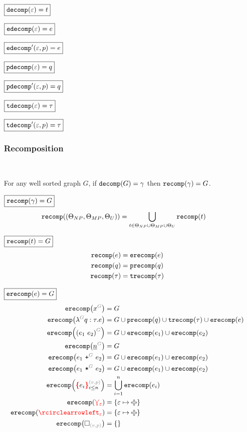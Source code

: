 \noindent $\boxed{\decomp{\e} = t}$
%
\figureDecompositionDefDecompTerm

\noindent $\boxed{\edecomp{\e} = e}$
%
\figureDecompositionDefEdecomp

\noindent $\boxed{\edecompPrime{\e}{p} = e}$
%
\figureDecompositionDefEdecompPrime

\noindent $\boxed{\pdecomp{\e} = q}$
%
\figureDecompositionDefPdecomp

\noindent $\boxed{\pdecompPrime{\e}{p} = q}$
%
\figureDecompositionDefPdecompPrime

\noindent $\boxed{\tdecomp{\e} = \tau}$
%
\figureDecompositionDefTdecomp

\noindent $\boxed{\tdecompPrime{\e}{p} = \tau}$
%
\figureDecompositionDefTdecompPrime%


\subsubsection{Recomposition}\hspace*{\fill} \\

\begin{theorem}
  For any well sorted graph $G$,
  if $\decomp{G} = \Grove$ then $\recomp{\Grove} = G$.
\end{theorem}

\noindent $\boxed{\recomp{\Grove} = G}$
%
\begin{align*}
  \recomp{(\Set[NP], \Set[MP], \Set[U])} &= \bigcup_{t \in \Set[NP] \cup \Set[MP] \cup \Set[U]} \recomp{t}
\end{align*}

\noindent $\boxed{\recomp{t} = G}$
%
\begin{align*}
  \recomp{e} &= \erecomp{e} \\
  \recomp{q} &= \precomp{q} \\
  \recomp{\tau} &= \trecomp{\tau}
\end{align*}

\noindent $\boxed{\erecomp{e} = G}$
%
\begin{align*}
  \erecomp{\eVar{G}{x}} &= G
  \\
  \erecomp{\eFun{G}{q}{\tau}{e}}
    &= G \cup \precomp{q} \cup \trecomp{\tau} \cup \erecomp{e}
  \\
  \erecomp{\eApp{G}{e_1}{e_2}}
    &= G \cup \erecomp{e_1} \cup \erecomp{e_2}
  \\
  \erecomp{\eNum{G}{n}} &= G
  \\
  \erecomp{\ePlus{G}{e_1}{e_2}}
    &= G \cup \erecomp{e_1} \cup \erecomp{e_2}
  \\
  \erecomp{\eTimes{G}{e_1}{e_2}}
    &= G \cup \erecomp{e_1} \cup \erecomp{e_2}
  \\
  \erecomp{\conflictHole[i \leq n]{e_i}{v}{p}}
  &= \bigcup_{i=1}^n \erecomp{e_i}
  \\
  \erecomp{\multiVertex{\e}} &= \SetOf{\e \mapsto \Plus}
  \\
  \erecomp{\cycleVertex{\e}} &= \SetOf{\e \mapsto \Plus}
  \\
  \erecomp{\emptyHole{v}{p}} &= \SetOf{}
\end{align*}


